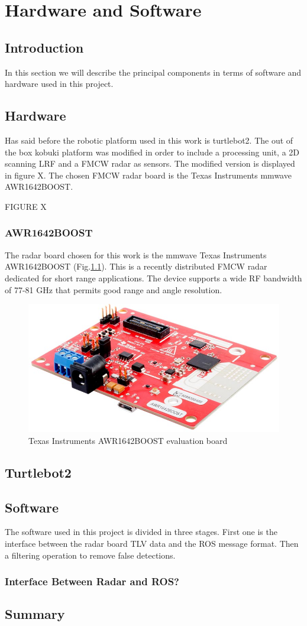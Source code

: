 \chapter{Hardware and Software}

\section{Introduction}
In this section we will describe the principal components in terms of software and hardware used in this project.
\section{Hardware}
Has said before the robotic platform used in this work is turtlebot2. The out of the box kobuki platform was modified in order to include a processing unit, a 2D scanning \ac{LRF} and a \ac{FMCW} radar as sensors. The modified version is displayed in figure X.  The chosen \ac{FMCW} radar board is the Texas Instruments mmwave AWR1642BOOST.

FIGURE X
\subsection{AWR1642BOOST}

The radar board chosen for this work is the mmwave Texas Instruments AWR1642BOOST (Fig.\ref{fig:awr}). This is a recently distributed \ac{FMCW} radar dedicated for short range applications. The device supports a wide RF bandwidth of 77-81 GHz that permits good range and angle resolution.

\begin{figure}[h] 
\centerline{\includegraphics [width=0.5 \textwidth]{imgs/chapter4/awr1642.jpg}}
\caption{Texas Instruments AWR1642BOOST evaluation board}
\label{fig:awr}
\end{figure}

\subsection{}

\section{Turtlebot2}
\section{Software}
The software used in this project is divided in three stages. First one is the interface between the radar board TLV data and the ROS message format. Then a filtering operation to remove false detections. 
\subsection{Interface Between Radar and ROS?}


\section{Summary}   


